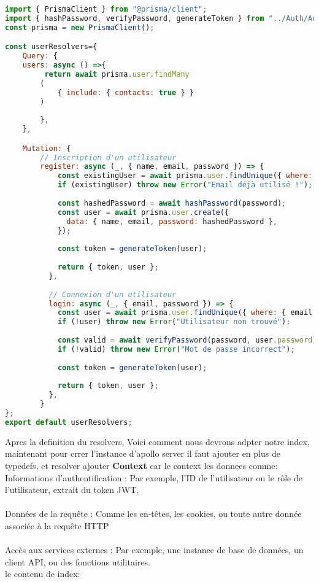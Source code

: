 \documentclass{article}
\begin{document}
   \begin{lstlisting}[language=JavaScript]
import { PrismaClient } from "@prisma/client";
import { hashPassword, verifyPassword, generateToken } from "../Auth/AuthUtils.js";
const prisma = new PrismaClient();

const userResolvers={
    Query: {
    users: async () =>{
         return await prisma.user.findMany
        (
            { include: { contacts: true } }
        )
        
        },
    },

    Mutation: {
        // Inscription d'un utilisateur
        register: async (_, { name, email, password }) => {
            const existingUser = await prisma.user.findUnique({ where: { email } });
            if (existingUser) throw new Error("Email déjà utilisé !");
            
            const hashedPassword = await hashPassword(password);
            const user = await prisma.user.create({
              data: { name, email, password: hashedPassword },
            });
      
            const token = generateToken(user);
      
            return { token, user };
          },
      
          // Connexion d'un utilisateur
          login: async (_, { email, password }) => {
            const user = await prisma.user.findUnique({ where: { email } });
            if (!user) throw new Error("Utilisateur non trouvé");
      
            const valid = await verifyPassword(password, user.password);
            if (!valid) throw new Error("Mot de passe incorrect");
      
            const token = generateToken(user);
      
            return { token, user };
          },
        }    
};
export default userResolvers;
 \end{lstlisting}
Apres la definition du resolvers, Voici comment nous devrons adpter notre index, maintenant pour crrer l'instance d'apollo server il faut ajouter en plus de typedefs, et resolver ajouter \textbf{Context} car le context les donnees comme:\\
Informations d'authentification : Par exemple, l'ID de l'utilisateur ou le rôle de l'utilisateur, extrait du token JWT.\\\\
Données de la requête : Comme les en-têtes, les cookies, ou toute autre donnée associée à la requête HTTP\\\\
Accès aux services externes : Par exemple, une instance de base de données, un client API, ou des fonctions utilitaires.\\
\Voici le contenu de index:
\end{document}
